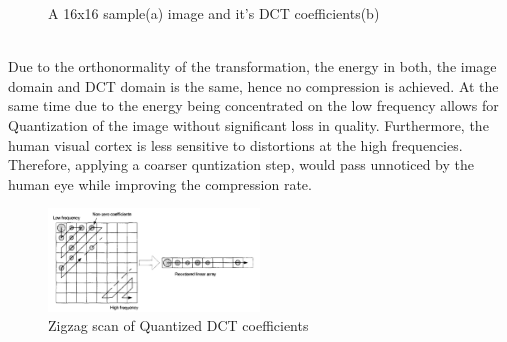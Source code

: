 \documentclass[a4paper,11pt,oneside]{article}
\begin{document}
\begin{figure}[h]
    \centering
    \qquad
    \caption{A 16x16 sample(a) image and it's DCT coefficients(b) \cite[p.~35]{richardson2002video}}
    \label{figure:DCTexample}
\end{figure} \\
\indent Due to the orthonormality of the transformation, the energy in both, the image domain and DCT domain is the same, hence no compression is achieved. At the same time due to the energy being concentrated on the low frequency allows for Quantization of the image without significant loss in quality. Furthermore, the human visual cortex is less sensitive to distortions at the high frequencies. Therefore, applying a coarser quntization step, would pass unnoticed by the human eye while improving the compression rate. \\
\begin{figure}
    \includegraphics[width=0.5\textwidth]{../figures/zigzag_reorder_QDCT.pdf}
    \caption{Zigzag scan of Quantized DCT coefficients \cite[p.40]{richardson2002video}}
    \label{figure:zigzag_scan}
\end{figure}
\end{document}
